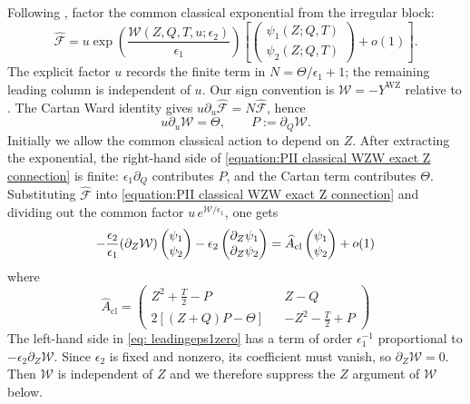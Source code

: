\documentclass[a4paper,11pt]{article}
\newcommand{\cF}{\mathcal{F}}
\numberwithin{equation}{section}
\begin{document}
Following \cite[Eq.~(D.12)]{FrenkelGukovTeschner2015}, factor the
common classical exponential from the irregular block:
\begin{equation}
	\label{equation:PII classical WZW WKB ansatz}
	\widehat{\cF}
	=u\exp\left(\frac{\mathcal{W}(Z,Q,T,u;\epsilon_{2})}{\epsilon_{1}}\right)
	\left[\begin{pmatrix}\psi_{1}(Z;Q,T)\\\psi_{2}(Z;Q,T)\end{pmatrix}
	+o(1)\right].
\end{equation}
The explicit factor $u$ records the finite term in
$N=\Theta/\epsilon_{1}+1$; the remaining leading column is independent of $u$. 
Our sign convention is $\mathcal{W}=-Y^{\mathrm{WZ}}$ relative to
\cite[Eq.~(D.12)]{FrenkelGukovTeschner2015}.
The Cartan Ward identity gives
$u\partial_{u}\widehat{\cF}=N\widehat{\cF}$, hence
\begin{equation}
	u\partial_{u}\mathcal{W}=\Theta,
	\qquad
	P:=\partial_{Q}\mathcal{W}.
\end{equation}
Initially we allow the common classical action to depend on $Z$.
After extracting the exponential, the right-hand side of
\eqref{equation:PII classical WZW exact Z connection} is finite:
$\epsilon_{1}\partial_{Q}$ contributes $P$, and the Cartan term
contributes $\Theta$.  Substituting $\widehat{\cF}$ into
\eqref{equation:PII classical WZW exact Z connection} and dividing out
the common factor $u\,e^{\mathcal{W}/\epsilon_{1}}$, one gets
\begin{equation}
\label{eq: leadingeps1zero}
-\frac{\epsilon_2}{\epsilon_1}(\partial_Z {\cal{W}}) \begin{pmatrix} \psi_1 \\ \psi_2 \end{pmatrix}
-\epsilon_2\begin{pmatrix}\partial_Z\psi_1 \\ \partial_Z\psi_2
\end{pmatrix}
= \widehat{A}_{\mathrm{cl}} \begin{pmatrix} \psi_1 \\ \psi_2 \end{pmatrix}+o(1)
\end{equation}
where 
\begin{equation}
\widehat{A}_{\mathrm{cl}}
= \begin{pmatrix}
Z^2 + \frac{T}{2} - P && Z-Q \\ 2[(Z+Q)P-\Theta] && -Z^2 - \frac{T}{2} + P
\end{pmatrix}
\end{equation}
The left-hand side in \eqref{eq: leadingeps1zero} has a term of
order $\epsilon_{1}^{-1}$ proportional to
$-\epsilon_{2}\partial_{Z}\mathcal{W}$.  Since $\epsilon_{2}$ is
fixed and nonzero, its coefficient must vanish, so
$\partial_{Z}\mathcal{W}=0$.  Then $\mathcal{W}$ is independent of $Z$ and we therefore suppress the $Z$
argument of $\mathcal{W}$ below.
\end{document}
